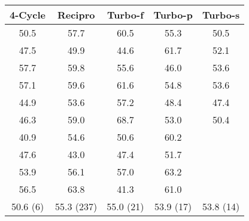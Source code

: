 \begin{tabular}{ccccc}
  \hline
  \textbf{4-Cycle} & \textbf{Recipro} & \textbf{Turbo-f} & \textbf{Turbo-p} & \textbf{Turbo-s} \\
  \hline
  \hline
  50.5 & 57.7 & 60.5 & 55.3 & 50.5 \\
  47.5 & 49.9 & 44.6 & 61.7 & 52.1 \\
  57.7 & 59.8 & 55.6 & 46.0 & 53.6 \\
  57.1 & 59.6 & 61.6 & 54.8 & 53.6 \\
  44.9 & 53.6 & 57.2 & 48.4 & 47.4 \\
  46.3 & 59.0 & 68.7 & 53.0 & 50.4 \\
  40.9 & 54.6 & 50.6 & 60.2 \\
  47.6 & 43.0 & 47.4 & 51.7 \\
  53.9 & 56.1 & 57.0 & 63.2 \\
  56.5 & 63.8 & 41.3 & 61.0 \\
  \hline
  50.6 (6) & 55.3 (237) & 55.0 (21) & 53.9 (17) & 53.8 (14) \\
  \hline
\end{tabular}
